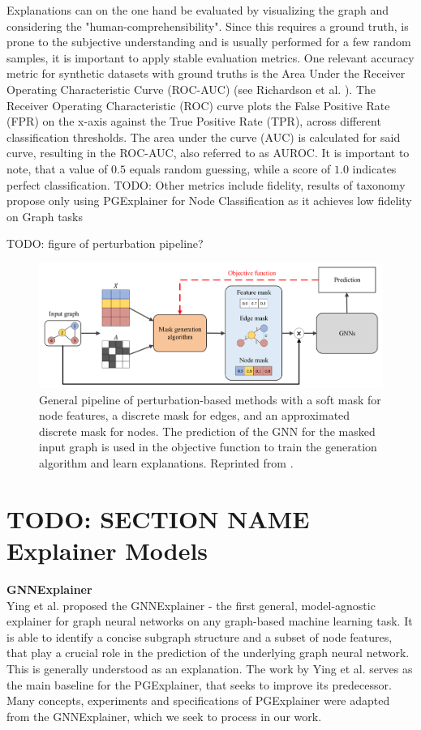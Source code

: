 Explanations can on the one hand be evaluated by visualizing the graph and considering the "human-comprehensibility". Since this requires a ground truth, is prone to the subjective understanding and is usually performed for a few random samples, it is important to apply stable evaluation metrics. One relevant accuracy metric for synthetic datasets with ground truths is the Area Under the Receiver Operating Characteristic Curve (ROC-AUC) (see Richardson et al. \cite{RICHARDSON2024100994}). The Receiver Operating Characteristic (ROC) curve plots the False Positive Rate (FPR) on the x-axis against the True Positive Rate (TPR), across different classification thresholds. The area under the curve (AUC) is calculated for said curve, resulting in the ROC-AUC, also referred to as AUROC. It is important to note, that a value of $0.5$ equals random guessing, while a score of $1.0$ indicates perfect classification. TODO: Other metrics include fidelity, results of taxonomy propose only using PGExplainer for Node Classification as it achieves low fidelity on Graph tasks

TODO: figure of perturbation pipeline?
\begin{figure}
    \includegraphics[width=\textwidth]{img/perturbation_pipeline.png}
    \caption{\small General pipeline of perturbation-based methods with a soft mask for node features, a discrete mask for edges, and an approximated discrete mask for nodes. The prediction of the GNN for the masked input graph is used in the objective function to train the generation algorithm and learn explanations. Reprinted from \cite{yuan2022explainability}.}
    \label{fig:perturbation_pipeline}
\end{figure}

\section{TODO: SECTION NAME Explainer Models}
\label{sec:Explainer_Models}

\textbf{GNNExplainer} \\
Ying et al. proposed the GNNExplainer \cite{ying2019gnnexplainer} - the first general, model-agnostic explainer for graph neural networks on any graph-based machine learning task. It is able to identify a concise subgraph structure and a subset of node features, that play a crucial role in the prediction of the underlying graph neural network. This is generally understood as an explanation. The work by Ying et al. serves as the main baseline for the PGExplainer, that seeks to improve its predecessor. Many concepts, experiments and specifications of PGExplainer were adapted from the GNNExplainer, which we seek to process in our work. \bigskip

